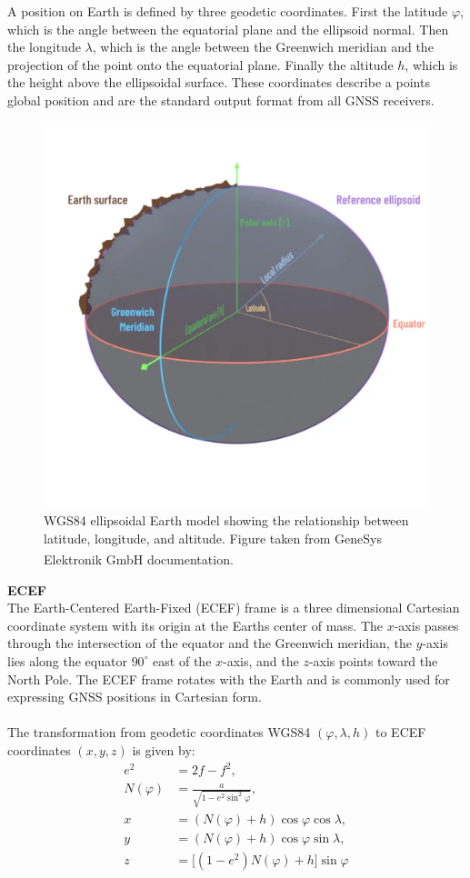 A position on Earth is defined by three geodetic coordinates. First the latitude $\varphi$, which is the angle between the equatorial plane and the ellipsoid normal. Then the longitude $\lambda$, which is the angle between the Greenwich meridian and the projection of the point onto the equatorial plane. Finally the altitude $h$, which is the height above the ellipsoidal surface. These coordinates describe a points global position and are the standard output format from all GNSS receivers.
\begin{figure}[H]
    \centering
    \includegraphics[width=0.7\linewidth]{Pictures/System_Modeling/Reference_Frames_and_Transformations/WGS84.png}
    \caption{WGS84 ellipsoidal Earth model showing the relationship between latitude, longitude, and altitude. Figure taken from GeneSys Elektronik GmbH documentation.\textsuperscript{\cite{WGS84}}}
    \label{fig:system-Modeling-wgs84-ellipsoid}
\end{figure}
\noindent
\textbf{ECEF}
\\ \noindent
The Earth-Centered Earth-Fixed (ECEF) frame is a three dimensional Cartesian coordinate system with its origin at the Earths center of mass. The $x$-axis passes through the intersection of the equator and the Greenwich meridian, the $y$-axis lies along the equator $90^{\circ}$ east of the $x$-axis, and the $z$-axis points toward the North Pole. The ECEF frame rotates with the Earth and is commonly used for expressing GNSS positions in Cartesian form.  
\\ \\
The transformation from geodetic coordinates WGS84 $(\varphi, \lambda, h)$ to ECEF coordinates $(x, y, z)$ is given by:
$$
    \begin{aligned}
        e^2 &= 2f - f^2, \\
        N(\varphi) &= \frac{a}{\sqrt{1 - e^2 \sin^2\varphi}}, \\
        x &= (N(\varphi) + h)\cos\varphi\cos\lambda, \\
        y &= (N(\varphi) + h)\cos\varphi\sin\lambda, \\
        z &= \big[(1 - e^2)N(\varphi) + h\big]\sin\varphi
    \end{aligned}
$$
